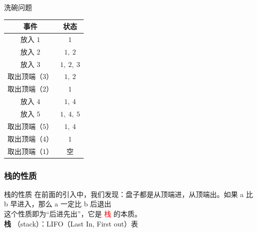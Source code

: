 \documentclass{beamer}
\begin{document}
\begin{frame}{洗碗问题}
    \begin{center}
    \begin{tabular}{cc}
        \toprule
        事件 & 状态 \\
        \hline
        放入 $1$ & $1$ \\
        放入 $2$ & $1, \ 2$ \\
        放入 $3$ & $1, \ 2, \ 3$ \\
        取出顶端（$3$）& $1, \ 2$ \\
        取出顶端（$2$） & $1$ \\
        放入 $4$ & $1, \ 4$ \\
        放入 $5$ & $1, \ 4, \ 5$ \\
        取出顶端（$5$） & $1, \ 4$ \\
        取出顶端（$4$） & $1$ \\
        取出顶端（$1$） & 空 \\
        \bottomrule
    \end{tabular}
    \end{center}
\end{frame}

\subsubsection{栈的性质}
\begin{frame}{栈的性质}
    在前面的引入中，我们发现：盘子都是从顶端进，从顶端出。如果 a 比 b 早进入，那么 a 一定比 b 后退出\\

    这个性质即为“后进先出”，它是 \textcolor{red}{栈} 的本质。 \\

    \textbf{栈} （stack）：LIFO（Last In, First out）表 \\
\end{frame}
\end{document}
